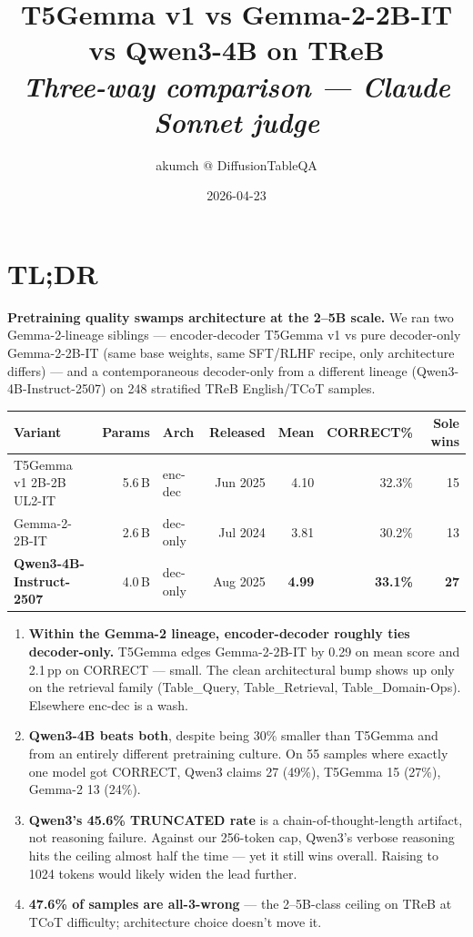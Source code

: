 \documentclass[11pt]{article}
\title{\vspace{-2em}\textbf{T5Gemma v1 vs Gemma-2-2B-IT vs Qwen3-4B on TReB}\\
\vspace{0.2em}\large{\normalfont\itshape Three-way comparison --- Claude Sonnet judge}}
\author{\small akumch @ DiffusionTableQA}
\date{\small 2026-04-23}
\begin{document}
\maketitle
\vspace{-2em}

\section*{TL;DR}

\textbf{Pretraining quality swamps architecture at the 2--5B scale.} We ran two
Gemma-2-lineage siblings --- encoder-decoder T5Gemma v1 vs pure decoder-only
Gemma-2-2B-IT (same base weights, same SFT/RLHF recipe, only architecture
differs) --- and a contemporaneous decoder-only from a different lineage
(Qwen3-4B-Instruct-2507) on 248 stratified TReB English/TCoT samples.

\begin{center}\small
\begin{tabular}{lrlrrrr}
\toprule
\textbf{Variant} & \textbf{Params} & \textbf{Arch} & \textbf{Released} & \textbf{Mean} & \textbf{CORRECT\%} & \textbf{Sole wins} \\
\midrule
T5Gemma v1 2B-2B UL2-IT & 5.6\,B & enc-dec & Jun 2025 & 4.10 & 32.3\% & 15 \\
Gemma-2-2B-IT           & 2.6\,B & dec-only & Jul 2024 & 3.81 & 30.2\% & 13 \\
\rowcolor{hilite}
\textbf{Qwen3-4B-Instruct-2507} & 4.0\,B & dec-only & Aug 2025 & \textbf{4.99} & \textbf{33.1\%} & \textbf{27} \\
\bottomrule
\end{tabular}
\end{center}

\begin{enumerate}
  \item \textbf{Within the Gemma-2 lineage, encoder-decoder roughly ties decoder-only.}
        T5Gemma edges Gemma-2-2B-IT by 0.29 on mean score and 2.1\,pp on CORRECT --- small.
        The clean architectural bump shows up only on the retrieval family
        (Table\_Query, Table\_Retrieval, Table\_Domain-Ops). Elsewhere enc-dec is a wash.
  \item \textbf{Qwen3-4B beats both}, despite being 30\% smaller than T5Gemma and
        from an entirely different pretraining culture. On 55 samples where exactly
        one model got CORRECT, Qwen3 claims 27 (49\%), T5Gemma 15 (27\%), Gemma-2 13 (24\%).
  \item \textbf{Qwen3's 45.6\% TRUNCATED rate} is a chain-of-thought-length artifact,
        not reasoning failure. Against our 256-token cap, Qwen3's verbose reasoning
        hits the ceiling almost half the time --- yet it still wins overall. Raising
        to 1024 tokens would likely widen the lead further.
  \item \textbf{47.6\% of samples are all-3-wrong} --- the 2--5B-class ceiling on TReB
        at TCoT difficulty; architecture choice doesn't move it.
\end{enumerate}
\end{document}
